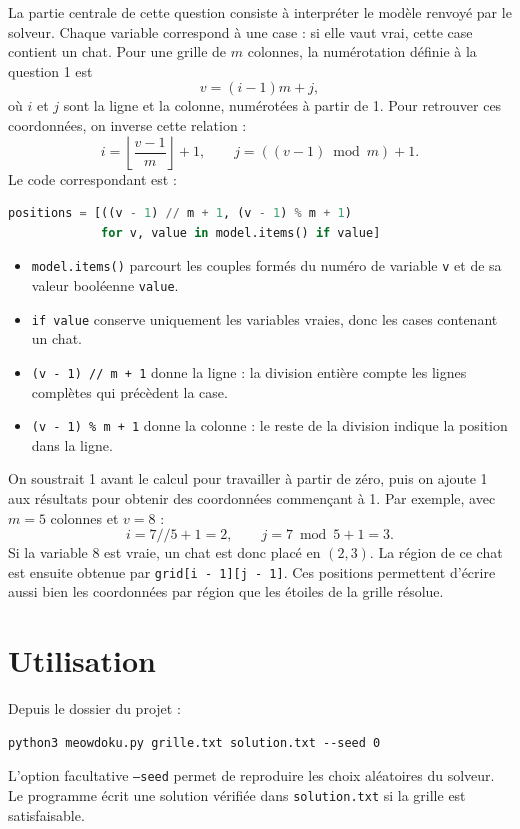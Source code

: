 \documentclass[11pt,a4paper]{article}
\begin{document}
La partie centrale de cette question consiste à interpréter le modèle
renvoyé par le solveur. Chaque variable correspond à une case : si elle
vaut vrai, cette case contient un chat. Pour une grille de $m$ colonnes,
la numérotation définie à la question 1 est
\[
  v=(i-1)m+j,
\]
où $i$ et $j$ sont la ligne et la colonne, numérotées à partir de 1.
Pour retrouver ces coordonnées, on inverse cette relation :
\[
  i=\left\lfloor\frac{v-1}{m}\right\rfloor+1,
  \qquad j=((v-1)\bmod m)+1.
\]
Le code correspondant est :
\begin{lstlisting}[language=Python]
positions = [((v - 1) // m + 1, (v - 1) % m + 1)
             for v, value in model.items() if value]
\end{lstlisting}
\begin{itemize}
  \item \texttt{model.items()} parcourt les couples formés du numéro
    de variable \texttt{v} et de sa valeur booléenne \texttt{value}.
  \item \texttt{if value} conserve uniquement les variables vraies,
    donc les cases contenant un chat.
  \item \texttt{(v - 1) // m + 1} donne la ligne : la division entière
    compte les lignes complètes qui précèdent la case.
  \item \texttt{(v - 1) \% m + 1} donne la colonne : le reste de la
    division indique la position dans la ligne.
\end{itemize}
On soustrait 1 avant le calcul pour travailler à partir de zéro, puis on
ajoute 1 aux résultats pour obtenir des coordonnées commençant à 1.
Par exemple, avec $m=5$ colonnes et $v=8$ :
\[
  i=7\mathbin{//}5+1=2,\qquad j=7\bmod5+1=3.
\]
Si la variable 8 est vraie, un chat est donc placé en $(2,3)$.
La région de ce chat est ensuite obtenue par
\texttt{grid[i - 1][j - 1]}. Ces positions permettent d'écrire aussi
bien les coordonnées par région que les étoiles de la grille résolue.

\section{Utilisation}

Depuis le dossier du projet :
\begin{lstlisting}
python3 meowdoku.py grille.txt solution.txt --seed 0
\end{lstlisting}
L'option facultative \texttt{--seed} permet de reproduire les choix
aléatoires du solveur. Le programme écrit une solution vérifiée dans
\texttt{solution.txt} si la grille est satisfaisable.
\end{document}
